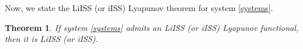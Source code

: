 \documentclass[onecolumn]{autart}
\newtheorem{theorem}{Theorem} %
\newenvironment{proof of Prop.ODE}{{\it Proof of Proposition~\ref{Prop.ODE}:\enspace}}{\hfill $\blacksquare$\par}
\newenvironment{proof of PDE}{{\it Proof of Proposition \ref{Prop.8}:\enspace}}{\hfill $\blacksquare$\par}
\begin{document}
{	%


Now, we state      the LiISS (or iISS) Lyapunov  theorem for system \eqref{systems}.
\begin{theorem} \label{TLiISS}
	{If system \eqref{systems} admits an LiISS (or iISS) Lyapunov functional, then it is LiISS (or iISS).}%
\end{theorem}

}
\end{document}
